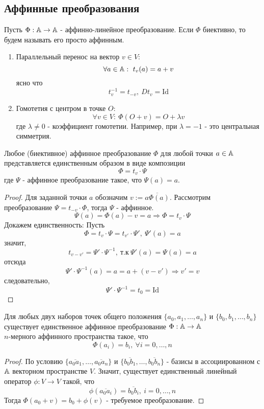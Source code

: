 \subsection{Аффинные преобразования}
\begin{definition}
    Пусть $\Phi:\mathbb{A}\to \mathbb{A}$ - аффинно-линейное преобразование. Если $\Phi$ биективно, то будем называть его просто аффинным.
\end{definition} 
\begin{example}\tab
    \begin{enumerate}
        \item Параллельный перенос на вектор $v\in V$:
        \[\forall a\in \mathbb{A}:\ t_v(a)=a+v\]
        ясно что 
        \[t^{-1}_v=t_{-v},\ Dt_v=\text{Id}\]
        \item Гомотетия с центром в точке $O$:
        \[\forall v\in V:\ \Phi(O+v)=O+\lambda v\]
        где $\lambda\ne 0$ - коэффициент гомотетии.
        Например, при $\lambda=-1$ - это центральная симметрия.
    \end{enumerate}
\end{example}
\begin{theorem}
    Любое (биективное) аффинное преобразование $\Phi$ для любой точки $a\in \mathbb{A}$ представляется единственным образом в виде композиции 
    \[\Phi=t_v\cdot \Psi\]
    где $\Psi$ - аффинное преобразование такое, что $\Psi(a)=a$. 
\end{theorem} 
\begin{proof}
    Для заданной точки $a$ обозначим $v:=\overline{a\Phi(a)}$. Рассмотрим преобразование $\Psi = t_{-v}\cdot \Phi$, тогда $\Psi$ - аффинное.
    \[\Psi(a)=\Phi(a)-v=a \Longrightarrow \Phi=t_v\cdot \Psi\]
    Докажем единственность: Пусть 
    \[\Phi=t_v\cdot \Psi=t_{v'}\cdot \Psi',\ \Psi'(a)=a\]
    значит,
    \[t_{v-v'}=\Psi'\cdot\Psi^{-1},\ \text{т.к}\ \Psi'(a)=\Psi(a)=a\]
    отсюда
    \[\Psi'\cdot \Psi^{-1}(a)=a=a+(v-v') \Longrightarrow v'=v\]
    следовательно,
    \[\Psi'\cdot\Psi^{-1}=t_0=\text{Id}\]
\end{proof} 
\begin{theorem}
    Для любых двух наборов точек общего положения $\{a_0, a_1,\dots,a_n\}$ и $\{b_0,b_1,\dots,b_n\}$ существует единственное аффинное преобразование $\Phi: \mathbb{A}\to \mathbb{A}$\\
    $n$-мерного аффинного пространства такое, что
    \[\Phi(a_i)=b_i,\ \forall i=0,\dots,n\]
\end{theorem} 
\begin{proof}
    По условию $\{\overline{a_0a_1},\dots,\overline{a_0a_n}\}$ и $\{\overline{b_0b_1},\dots,\overline{b_0b_n}\}$ - базисы в ассоциированном с $\mathbb{A}$ векторном пространстве $V$. Значит, существует единственный линейный оператор $\phi: V\to V$ такой, что
    \[\phi(\overline{a_0a_i})=\overline{b_0b_i},\ i=0,\dots, n\]
    Тогда $\Phi(a_0+v)=b_0+\phi(v)$ - требуемое преобразование.
\end{proof} 
